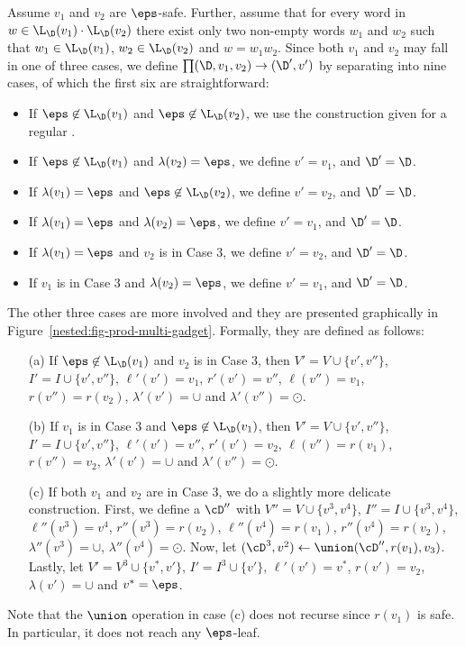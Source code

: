Assume $v_1$ and $v_2$ are $\eps$-safe. 
Further, assume that for every word in $w\in\L_{\D}(v_1)\cdot\L_{\D}(v_2)$ there exist only two non-empty words $w_1$ and $w_2$ such that $w_1\in\L_{\D}(v_1)$, $w_2\in\L_{\D}(v_2)$ and $w = w_1w_2$.
Since both $v_1$ and $v_2$ may fall in one of three cases, we define $\prod(\D,v_1,v_2) \to (\D',v')$ by separating into nine cases, of which the first six are straightforward: 
\begin{itemize}
	\item If $\eps\not\in\L_{\D}(v_1)$ and $\eps\not\in\L_{\D}(v_2)$,  we use the construction given for a regular \dsabbr.
	\item If $\eps\not\in\L_{\D}(v_1)$ and $\lambda(v_2) = \eps$, we define $v' = v_1$, and $\D' = \D$.
	\item If $\lambda(v_1) = \eps$ and $\eps\not\in\L_{\D}(v_2)$, we define $v' = v_2$, and $\D' = \D$.
	\item If $\lambda(v_1) = \eps$ and $\lambda(v_2) = \eps$, we define $v' = v_1$, and $\D' = \D$.
	\item If $\lambda(v_1) = \eps$ and $v_2$ is in Case 3, we define $v' = v_2$, and $\D' = \D$.
	\item If $v_1$ is in Case 3 and $\lambda(v_2) = \eps$, we define $v' = v_1$, and $\D' = \D$.
\end{itemize}



The other three cases are more involved and they are presented graphically in Figure~\ref{nested:fig-prod-multi-gadget}. 
Formally, they are defined as follows:

\begin{itemize}
	\item[(a)] If $\eps\not\in\L_{\D}(v_1)$ and $v_2$ is in Case 3, then $V' = V\cup\{v',v''\}$, $I' = I\cup\{v',v''\}$, $\ell'(v') = v_1$, $r'(v') = v''$, $\ell(v'') = v_1$,  $r(v'') = r(v_2)$, $\lambda'(v') = \cup$ and $\lambda'(v'') = \odot$. 
	\item[(b)] If $v_1$ is in Case 3 and $\eps\not\in\L_{\D}(v_1)$, then $V' = V\cup\{v',v''\}$, $I' = I\cup\{v',v''\}$, $\ell'(v') = v''$, $r'(v') = v_2$, $\ell(v'') = r(v_1)$,  $r(v'') = v_2$, $\lambda'(v') = \cup$ and $\lambda'(v'') = \odot$. 
	\item[(c)] If both $v_1$ and $v_2$ are in Case 3, we do a slightly more delicate construction. 
	First, we define a $\cD''$ with $V'' = V\cup\{v^{3},v^{4}\}$, $I'' = I\cup\{v^{3},v^{4}\}$, $\ell''(v^3) = v^4$, $r''(v^3) = r(v_2)$, $\ell''(v^4) = r(v_1)$, $r''(v^4) = r(v_2)$, $\lambda''(v^3) = \cup$, $\lambda''(v^4) = \odot$.
	Now, let $(\cD^3, v^2) \gets \union(\cD'', r(v_1), v_3)$.
	Lastly, let $V' = V^3 \cup \{v^{*}, v'\}$, $I' = I^3\cup\{v'\}$, $\ell'(v') = v^*$, $r(v') = v_2$, $\lambda(v') = \cup$ and $v^* = \eps$.
\end{itemize}
Note that the $\union$ operation in case (c) does not recurse since $r(v_1)$ is safe. In particular, it does not reach any $\eps$-leaf.


